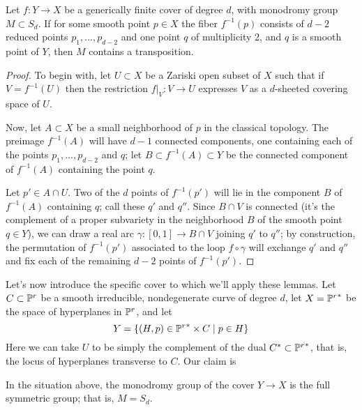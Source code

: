 \begin{lemma}\label{transposition lemma}
Let $f : Y \to X$ be a generically finite cover of degree $d$, with  monodromy group $M \subset S_d$. If for some smooth point $p \in X$ the fiber $f^{-1}(p)$ consists of $d-2$ reduced points $p_1,\dots, p_{d-2}$ and one point $q$ of multiplicity 2, and $q$ is a smooth point of $Y$, then $M$ contains a transposition.
\end{lemma}

\begin{proof} To begin with, let $U \subset X$ be a Zariski open subset of $X$ such that if $V = f^{-1}(U)$ then the restriction $f|_V : V \to U$ expresses $V$ as a $d$-sheeted covering space of $U$.

Now, let $A \subset X$ be a small neighborhood of $p$ in the classical topology. The preimage $f^{-1}(A)$ will have $d-1$ connected components, one containing each of the points $p_1,\dots,p_{d-2}$ and $q$; let
 $B \subset f^{-1}(A) \subset Y$ be the connected component of $f^{-1}(A)$ containing the point $q$.

Let $p' \in A \cap U$. Two of the $d$ points of $f^{-1}(p')$ will lie in the component $B$ of $f^{-1}(A)$ containing $q$; call these $q'$ and $q''$. Since $B \cap V$ is connected (it's the complement of a proper subvariety in the neighborhood $B$ of the smooth point $q \in Y$), we can draw a real arc $\gamma : [0,1] \to B \cap V$ joining $q'$ to $q''$; by construction, the permutation of $f^{-1}(p')$ associated to the loop $f \circ \gamma$ will exchange $q'$ and $q''$ and fix each of the remaining $d-2$ points of $f^{-1}(p')$.
\end{proof}

Let's now introduce the specific cover to which we'll apply these lemmas. Let $C \subset \PP^r$ be a smooth irreducible, nondegenerate curve of degree $d$, let $X = {\PP^r}^*$ be the space of hyperplanes in $\PP^r$, and let
$$
Y = \{ (H, p) \in {\PP^r}^* \times C \mid p \in H \}
$$
Here we can take $U$ to be simply the complement of the dual $C^* \subset {\PP^r}^*$, that is, the locus of hyperplanes transverse to $C$. Our claim is

\begin{lemma}\label{uniform position lemma}
In the situation above, the monodromy group of the cover $Y \to X$ is the full symmetric group; that is, $M = S_d$.
\end{lemma}

